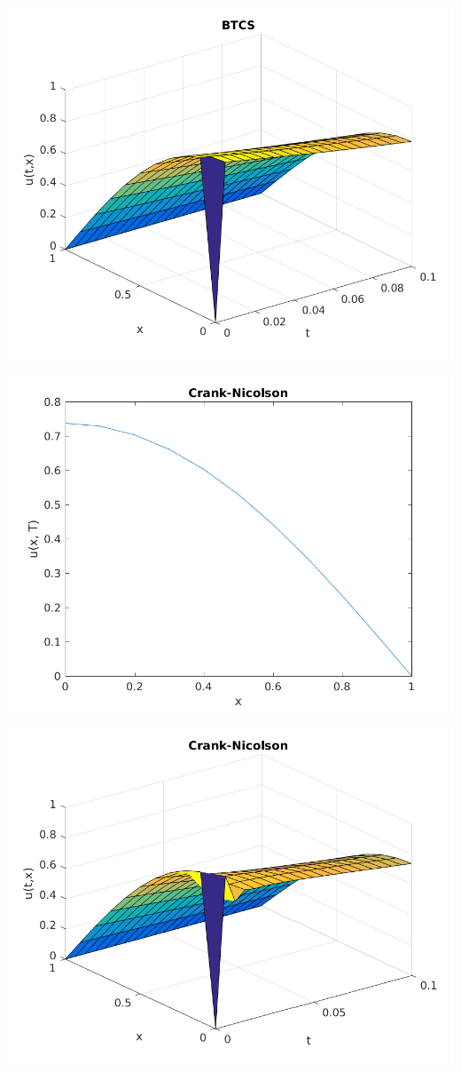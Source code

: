 \documentclass{article}
\begin{document}
\includegraphics{"q3_2"}
\pagebreak

\includegraphics{"q3_3"}
\pagebreak

\includegraphics{"q3_4"}
\pagebreak
\end{document}
